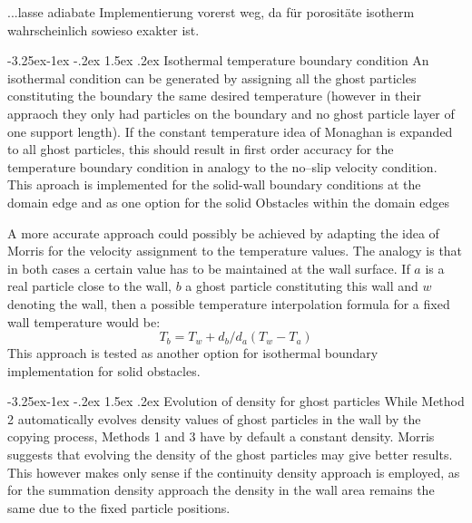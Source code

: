 \documentclass{report}
\makeatletter
\renewcommand\paragraph{\@startsection{paragraph}{4}{\z@}%
  {-3.25ex\@plus -1ex \@minus -.2ex}%
  {1.5ex \@plus .2ex}%
  {\normalfont\normalsize\bfseries}}
\makeatother
\begin{document}
...lasse adiabate Implementierung vorerst weg, da für porositäte isotherm wahrscheinlich sowieso exakter ist.

\paragraph{Isothermal temperature boundary condition}
\label{sec:BC_solid_Wall_isothermal}
An isothermal condition can be generated by assigning all the ghost particles constituting the boundary the same desired temperature \cite{Cleary1999} (however in their appraoch they only had particles on the boundary and no ghost particle layer of one support length). If the constant temperature idea of Monaghan is expanded to all ghost particles, this should result in first order accuracy for the temperature boundary condition in analogy to the no--slip velocity condition. This aproach is implemented for the solid-wall boundary conditions at the domain edge and as one option for the solid Obstacles within the domain edges

A more accurate approach could possibly be achieved by adapting the idea of Morris for the velocity assignment \cite{Morris1997, Zhu1999} to the temperature values. The analogy is that in both cases a certain value has to be maintained at the wall surface. If $a$ is a real particle close to the wall, $b$ a ghost particle constituting this wall and $w$ denoting the wall, then a possible temperature interpolation formula for a fixed wall temperature would be: %
\begin{equation}
 \label{eq:IsothermalBC_T_extrapolation}
T_b=T_w+d_b/d_a(T_w-T_a)
\end{equation}
This approach is tested as another option for isothermal boundary implementation for solid obstacles.


\paragraph{Evolution of density for ghost particles}
While Method 2 automatically evolves density values of ghost particles in the wall by the copying process, Methods 1 and 3 have by default a constant density. Morris \cite{Morris1997, Zhu1999} suggests that evolving the density of the ghost particles may give better results. This however makes only sense if the continuity density approach is employed, as for the summation density approach the density in the wall area remains the same due to the fixed particle positions. 
\end{document}
